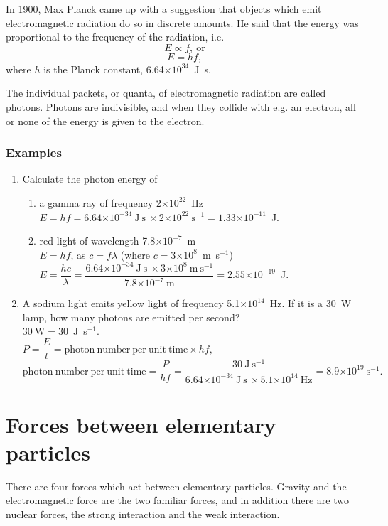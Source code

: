 \documentclass[a4paper,12pt]{article}
\providecommand{\e}[1]{\ensuremath{\times 10^{#1}}}
\begin{document}
In 1900, Max Planck came up with a suggestion that objects which emit electromagnetic radiation do so in discrete amounts.  He said that the energy was proportional to the frequency of the radiation, i.e.
\[E\propto f,\mathrm{~or}\]
\[E=hf,\]
where $h$ is the Planck constant, 6.64\e{34}~J~s.

The individual packets, or quanta, of electromagnetic radiation are called photons.  Photons are indivisible, and when they collide with e.g. an electron, all or none of the energy is given to the electron.

\subsubsection{Examples}

\begin{enumerate}
\item Calculate the photon energy of
\begin{enumerate}
\item a gamma ray of frequency 2\e{22}~Hz\\
$E=hf=6.64\e{-34}~\mathrm{J~s~}\times 2\e{22}~\mathrm{s}^{-1}=1.33\e{-11}$~J.
\item red light of wavelength 7.8\e{-7}~m\\
$E=hf$, as $c=f\lambda$ (where $c=3\e{8}$~m~s$^{-1}$)\\
$E=\dfrac{hc}{\lambda}=\dfrac{6.64\e{-34}~\mathrm{J~s~}\times 3\e{8}~\mathrm{m~s}^{-1}}{7.8\e{-7}~\mathrm{m}}=2.55\e{-19}$~J.
\end{enumerate}
\item A sodium light emits yellow light of frequency 5.1\e{14}~Hz.  If it is a 30~W lamp, how many photons are emitted per second?\\
$30~\mathrm{W}=30$~J~s$^{-1}.$\\
$P=\dfrac{E}{t}=\mathrm{photon~number~per~unit~time}\times hf,$\\
$\mathrm{photon~number~per~unit~time}=\dfrac{P}{hf}=\dfrac{30~\mathrm{J}~\mathrm{s}^{-1}}{6.64\e{-34}~\mathrm{J~s~}\times 5.1\e{14}~\mathrm{Hz}}=8.9\e{19}~\mathrm{s}^{-1}.$
\end{enumerate}

\section{Forces between elementary particles}

There are four forces which act between elementary particles.  Gravity and the electromagnetic force are the two familiar forces, and in addition there are two nuclear forces, the strong interaction and the weak interaction.\\
\end{document}
